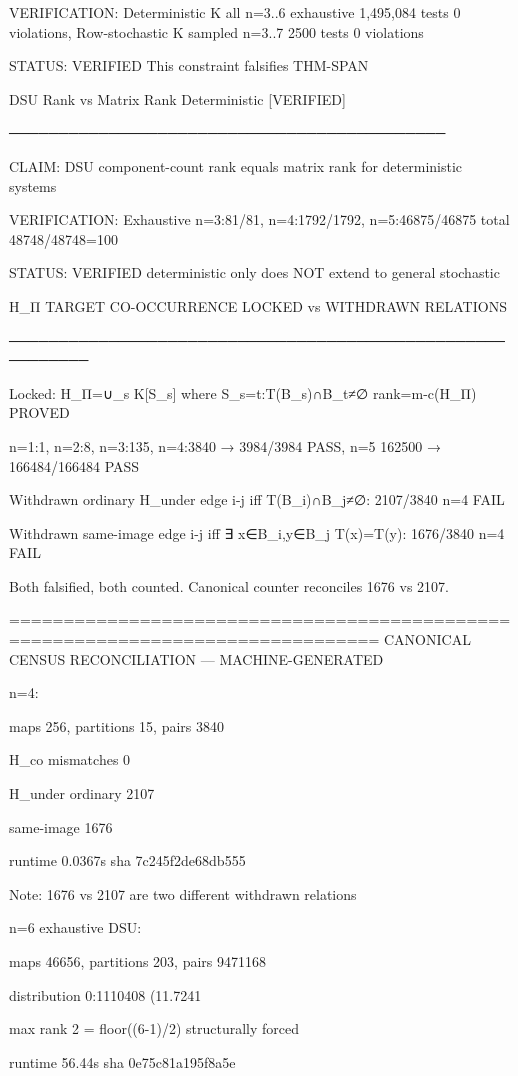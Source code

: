 VERIFICATION: Deterministic K all n=3..6 exhaustive 1,495,084 tests 0 violations, Row-stochastic K sampled n=3..7 2500 tests 0 violations

STATUS: VERIFIED This constraint falsifies THM-SPAN

DSU Rank vs Matrix Rank Deterministic [VERIFIED]

────────────────────────────────────────────

CLAIM: DSU component-count rank equals matrix rank for deterministic systems

VERIFICATION: Exhaustive n=3:81/81, n=4:1792/1792, n=5:46875/46875 total 48748/48748=100%

STATUS: VERIFIED deterministic only does NOT extend to general stochastic

H_Π TARGET CO-OCCURRENCE LOCKED vs WITHDRAWN RELATIONS

──────────────────────────────────────────────────────────

Locked: H_Π=∪_s K[S_s] where S_s={t:T(B_s)∩B_t≠∅} rank=m-c(H_Π) PROVED

n=1:1, n=2:8, n=3:135, n=4:3840 → 3984/3984 PASS, n=5 162500 → 166484/166484 PASS

Withdrawn ordinary H_under edge i-j iff T(B_i)∩B_j≠∅: 2107/3840 n=4 FAIL

Withdrawn same-image edge i-j iff ∃ x∈B_i,y∈B_j T(x)=T(y): 1676/3840 n=4 FAIL

Both falsified, both counted. Canonical counter reconciles 1676 vs 2107.

================================================================================ CANONICAL CENSUS RECONCILIATION — MACHINE-GENERATED

n=4:

maps 256, partitions 15, pairs 3840

H_co mismatches 0

H_under ordinary 2107

same-image 1676

runtime 0.0367s sha 7c245f2de68db555

Note: 1676 vs 2107 are two different withdrawn relations


n=6 exhaustive DSU:

maps 46656, partitions 203, pairs 9471168

distribution 0:1110408 (11.7241%

max rank 2 = floor((6-1)/2) structurally forced

runtime 56.44s sha 0e75c81a195f8a5e


